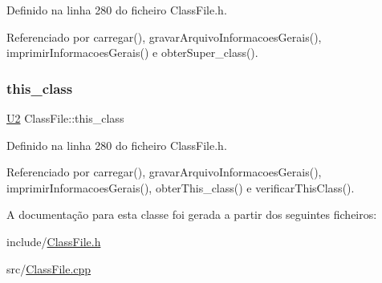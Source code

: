 Definido na linha 280 do ficheiro Class\+File.\+h.



Referenciado por carregar(), gravar\+Arquivo\+Informacoes\+Gerais(), imprimir\+Informacoes\+Gerais() e obter\+Super\+\_\+class().

\mbox{\label{classClassFile_a205bc5af050f4676fc4c3ff7992c4959}} 
\subsubsection{\texorpdfstring{this\+\_\+class}{this\_class}}
{\footnotesize\ttfamily \hyperlink{BasicTypes_8h_a90240657108b1b457eef9d3f76e0202e}{U2} Class\+File\+::this\+\_\+class\hspace{0.3cm}{\ttfamily [private]}}



Definido na linha 280 do ficheiro Class\+File.\+h.



Referenciado por carregar(), gravar\+Arquivo\+Informacoes\+Gerais(), imprimir\+Informacoes\+Gerais(), obter\+This\+\_\+class() e verificar\+This\+Class().



A documentação para esta classe foi gerada a partir dos seguintes ficheiros\+:\begin{DoxyCompactItemize}
\item 
include/\hyperlink{ClassFile_8h}{Class\+File.\+h}\item 
src/\hyperlink{ClassFile_8cpp}{Class\+File.\+cpp}\end{DoxyCompactItemize}
